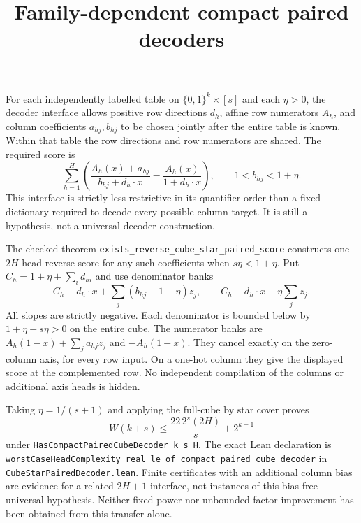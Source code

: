 \documentclass{article}
\begin{document}
\title{Family-dependent compact paired decoders}
\maketitle
For each independently labelled table on $\{0,1\}^k\times[s]$ and each
$\eta>0$, the decoder interface allows positive row directions $d_h$,
affine row numerators $A_h$, and column coefficients $a_{hj},b_{hj}$ to be
chosen jointly after the entire table is known. Within that table the row
directions and row numerators are shared. The required score is
\[
 \sum_{h=1}^H\left(\frac{A_h(x)+a_{hj}}{b_{hj}+d_h\cdot x}
 -\frac{A_h(x)}{1+d_h\cdot x}\right),\qquad 1<b_{hj}<1+\eta.
\]
This interface is strictly less restrictive in its quantifier order than
a fixed dictionary required to decode every possible column target.
It is still a hypothesis, not a universal decoder construction.

The checked theorem \texttt{exists\_reverse\_cube\_star\_paired\_score}
constructs one $2H$-head reverse score for any such coefficients when
$s\eta<1+\eta$. Put $C_h=1+\eta+\sum_i d_{hi}$ and use denominator banks
\[
 C_h-d_h\cdot x+\sum_j(b_{hj}-1-\eta)z_j,
 \qquad C_h-d_h\cdot x-\eta\sum_jz_j.
\]
All slopes are strictly negative. Each denominator is bounded below by
$1+\eta-s\eta>0$ on the entire cube. The numerator banks are
$A_h(1-x)+\sum_j a_{hj}z_j$ and $-A_h(1-x)$.
They cancel exactly on the zero-column axis, for every row input. On a
one-hot column they give the displayed score at the complemented row.
No independent compilation of the columns or additional axis heads is hidden.

Taking $\eta=1/(s+1)$ and applying the full-cube by star cover proves
\[
 W(k+s)\leq\frac{22\,2^s(2H)}{s}+2^{k+1}
\]
under \texttt{HasCompactPairedCubeDecoder k s H}.
The exact Lean declaration is
\texttt{worstCaseHeadComplexity\_real\_le\_of\_compact\_paired\_cube\_decoder}
in \texttt{CubeStarPairedDecoder.lean}. Finite certificates with an additional
column bias are evidence for a related $2H+1$ interface, not instances of this
bias-free universal hypothesis. Neither fixed-power nor unbounded-factor
improvement has been obtained from this transfer alone.
\end{document}

